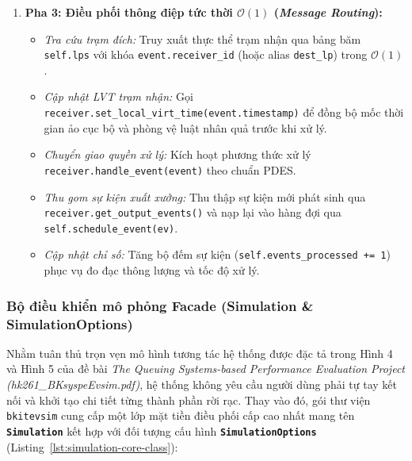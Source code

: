 \begin{enumerate}[leftmargin=1.8em, itemsep=1.5pt, topsep=1.5pt]
\item \textbf{Pha 3: Điều phối thông điệp tức thời $\mathcal{O}(1)$ (\textit{Message Routing}):}
\begin{itemize}[leftmargin=1.2em, itemsep=0.5pt]
\item \textit{Tra cứu trạm đích:} Truy xuất thực thể trạm nhận qua bảng băm \texttt{self.lps} với khóa \texttt{event.receiver\_id} (hoặc alias \texttt{dest\_lp}) trong $\mathcal{O}(1)$.
\item \textit{Cập nhật LVT trạm nhận:} Gọi \texttt{receiver.set\_local\_virt\_time(event.timestamp)} để đồng bộ mốc thời gian ảo cục bộ và phòng vệ luật nhân quả trước khi xử lý.
\item \textit{Chuyển giao quyền xử lý:} Kích hoạt phương thức xử lý \texttt{receiver.}\allowbreak\texttt{handle\_event(event)} theo chuẩn PDES.
\item \textit{Thu gom sự kiện xuất xưởng:} Thu thập sự kiện mới phát sinh qua \texttt{receiver.}\allowbreak\texttt{get\_output\_events()} và nạp lại vào hàng đợi qua \texttt{self.schedule\_event(ev)}.
\item \textit{Cập nhật chỉ số:} Tăng bộ đếm sự kiện (\texttt{self.events\_processed += 1}) phục vụ đo đạc thông lượng và tốc độ xử lý.
\end{itemize}
\end{enumerate}

\subsubsection{Bộ điều khiển mô phỏng Facade (Simulation \& SimulationOptions)}
\label{subsubsec:simulation-controller}

\hspace{0.5cm}Nhằm tuân thủ trọn vẹn mô hình tương tác hệ thống được đặc tả trong Hình 4 và Hình 5 của đề bài \textit{The Queuing Systems-based Performance Evaluation Project (hk261\_BKsyspeEvsim.pdf)}, hệ thống không yêu cầu người dùng phải tự tay kết nối và khởi tạo chi tiết từng thành phần rời rạc. Thay vào đó, gói thư viện \texttt{bkitevsim} cung cấp một lớp mặt tiền điều phối cấp cao nhất mang tên \textbf{\texttt{Simulation}} kết hợp với đối tượng cấu hình \textbf{\texttt{SimulationOptions}} (Listing~\ref{lst:simulation-core-class}):

